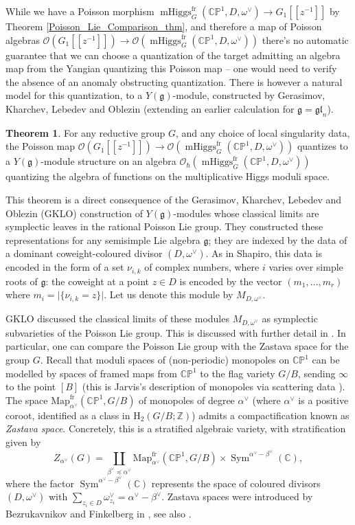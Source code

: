 \documentclass[11pt, oneside, reqno]{amsart}
\theoremstyle{definition} \newtheorem{definition}{Definition}[section]
\newtheorem{theorem}[definition]{Theorem}
\theoremstyle{definition} \newtheorem{remark}[definition]{Remark}
\theoremstyle{definition} \newtheorem{remarks}[definition]{Remarks}
\theoremstyle{definition} \newtheorem{question}[definition]{Question}
\theoremstyle{definition} \newtheorem*{note}{Note}
\theoremstyle{definition} \newtheorem{example}[definition]{Example}
\theoremstyle{definition} \newtheorem{examples}[definition]{Examples}
\renewcommand{\gg}{\mathfrak{g}}
\newcommand{\bb}[1]{\mathbb{#1}}
\newcommand{\mr}[1]{\mathrm{#1}}
\newcommand{\CC}{\mathbb{C}}
\newcommand{\OO}{\mathcal{O}}
\newcommand{\ZZ}{\mathbb{Z}}
\newcommand{\gl}{\mathfrak{gl}}
\DeclareMathOperator{\sym}{Sym}
\DeclareMathOperator{\mhiggs}{mHiggs}
\newcommand{\fr}{\mathrm{fr}}
\begin{document}
While we have a Poisson morphism $\mhiggs^\fr_G(\bb{CP}^1,D,\omega^\vee) \to G_1[[z^{-1}]]$ by Theorem \ref{Poisson_Lie_Comparison_thm}, and therefore a map of Poisson algebras $\OO(G_1[[z^{-1}]]) \to \OO(\mhiggs^\fr_G(\bb{CP}^1,D,\omega^\vee))$ there's no automatic guarantee that we can choose a quantization of the target admitting an algebra map from the Yangian quantizing this Poisson map -- one would need to verify the absence of an anomaly obstructing quantization.  There is however a natural model for this quantization, to a $Y(\gg)$-module,  constructed by Gerasimov, Kharchev, Lebedev and Oblezin \cite{GKLO} (extending an earlier calculation \cite{GKL} for $\gg = \gl_n$).

\begin{theorem}
For any reductive group $G$, and any choice of local singularity data, the Poisson map $\OO(G_1[[z^{-1}]]) \to \OO(\mhiggs^\fr_G(\bb{CP}^1,D,\omega^\vee))$ quantizes to a $Y(\gg)$-module structure on an algebra $\OO_\hbar(\mhiggs^\fr_G(\bb{CP}^1,D,\omega^\vee))$ quantizing the algebra of functions on the multiplicative Higgs moduli space.  
\end{theorem}

This theorem is a direct consequence of the Gerasimov, Kharchev, Lebedev and Oblezin (GKLO) construction of $Y(\gg)$-modules whose classical limits are symplectic leaves in the rational Poisson Lie group.  They constructed these representations for any semisimple Lie algebra $\gg$; they are indexed by the data of a dominant coweight-coloured divisor $(D, \omega^\vee)$.  As in Shapiro, this data is encoded in the form of a set $\nu_{i,k}$ of complex numbers, where $i$ varies over simple roots of $\gg$: the coweight at a point $z \in D$ is encoded by the vector $(m_1, \ldots, m_r)$ where $m_i = \lvert\{\nu_{i,k} = z\}\rvert$.  Let us denote this module by $M_{D,\omega^\vee}$.

GKLO discussed the classical limits of these modules $M_{D,\omega^\vee}$ as symplectic subvarieties of the Poisson Lie group.  This is discussed with further detail in \cite[Section 4]{Shapiro}.  In particular, one can compare the Poisson Lie group with the Zastava space for the group $G$.  Recall that  moduli spaces of (non-periodic) monopoles on $\bb{CP}^1$ can be modelled by spaces of framed maps from $\bb{CP}^1$ to the flag variety $G/B$, sending $\infty$ to the point $[B]$ (this is Jarvis's description of monopoles via scattering data \cite{Jarvis}).  The space $\mr{Map}_{\alpha^\vee}^\fr(\bb{CP}^1, G/B)$ of monopoles of degree $\alpha^\vee$ (where $\alpha^\vee$ is a positive coroot, identified as a class in $\mr H_2(G/B;\ZZ)$) admits a compactification known as \emph{Zastava space}.  Concretely, this is a stratified algebraic variety, with stratification given by
\[Z_{\alpha^\vee}(G) = \coprod_{\beta^\vee \preceq \alpha^\vee} \mr{Map}_{\alpha^\vee}^\fr(\bb{CP}^1, G/B) \times \sym^{\alpha^\vee - \beta^\vee}(\CC),\]
where the factor $\sym^{\alpha^\vee - \beta^\vee}(\CC)$ represents the space of coloured divisors $(D, \omega^\vee)$ with $\sum_{z_i \in D} \omega^\vee_{z_i} = \alpha^\vee - \beta^\vee$.  Zastava spaces were introduced by Bezrukavnikov and Finkelberg in \cite{BezrukavnikovFinkelbergI}, see also \cite{BravermanICM}.
\end{document}
